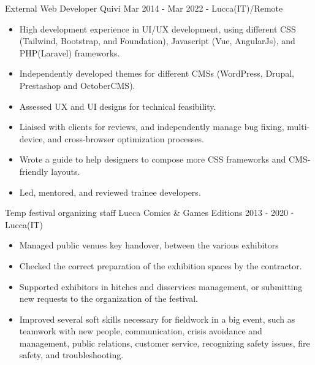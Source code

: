 \documentclass[11pt]{strongalecv}
\begin{document}
\begin{MainPart}
    \Experience
        {\ColorTextMain}
		{External Web Developer}
		{Quivi}
        {\faCalendarO\space Mar 2014 - Mar 2022 - \faMapMarker\space  Lucca(IT)/Remote}
        {   
            \begin{itemize}[leftmargin=0.5cm, itemsep=0.1cm]
                \item [{\color{purple}\tiny\faSquare}] \small High development experience in UI/UX development, using different CSS (Tailwind, Bootstrap, and Foundation), Javascript (Vue, AngularJs), and PHP(Laravel) frameworks.
                \item [{\color{purple}\tiny\faSquare}] \small Independently developed themes for different CMSs (WordPress, Drupal, Prestashop and OctoberCMS).
                \item [{\color{purple}\tiny\faSquare}] \small Assessed UX and UI designs for technical feasibility.
                \item [{\color{purple}\tiny\faSquare}] \small Liaised with clients for reviews, and independently manage bug fixing, multi-device, and cross-browser optimization processes.
                \item [{\color{purple}\tiny\faSquare}] \small Wrote a guide to help designers to compose more CSS frameworks and CMS-friendly layouts.
                \item [{\color{purple}\tiny\faSquare}] \small Led, mentored, and reviewed trainee developers.
            \end{itemize}
        }
    \Experience
        {\ColorTextMain}
		{Temp festival organizing staff}
		{Lucca Comics \& Games}
        {\faCalendarO\space Editions 2013 - 2020 - \faMapMarker\space  Lucca(IT)}
        {   
            \begin{itemize}[leftmargin=0.5cm, itemsep=0.1cm]
                \item [{\color{purple}\tiny\faSquare}] \small Managed public venues key handover, between the various exhibitors
                \item [{\color{purple}\tiny\faSquare}] \small Checked the correct preparation of the exhibition spaces by the contractor.
                \item [{\color{purple}\tiny\faSquare}] \small Supported exhibitors in hitches and disservices management, or submitting new requests to the organization of the festival.
                \item [{\color{purple}\tiny\faSquare}] \small Improved several soft skills necessary for fieldwork in a big event, such as teamwork with new people, communication, crisis avoidance and management, public relations, customer service, recognizing safety issues, fire safety, and troubleshooting.
            \end{itemize}
        }
        


\end{MainPart}
\end{document}
